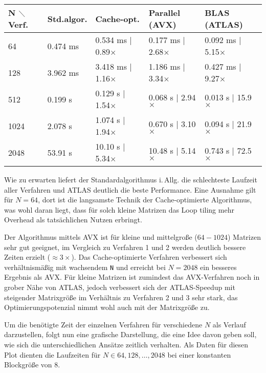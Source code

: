 \documentclass[a4paper,11pt]{scrartcl}
\newcommand{\iAllg}{\mbox{i.\,Allg.}\xspace}
\begin{document}
\begin{center}
\begin{tabular}{| l | l || l || l || l |}
\hline
N $\diagdown$ Verf. & Std.algor. & Cache-opt. & Parallel (AVX) & BLAS (ATLAS)  \\ \hline

64 & 0.474 ms & 0.534 ms | 0.89$\times$ & 0.177 ms | 2.68$\times$ & 0.092 ms | 5.15$\times$  \\ \hline
128 & 3.962 ms & 3.418 ms | 1.16$\times$ & 1.186 ms | 3.34$\times$ & 0.427 ms | 9.27$\times$  \\ \hline 
\hline
512 & 0.199 s & 0.129 s | 1.54$\times$ & 0.068 s | 2.94$\times$ & 0.013 s | 15.9$\times$  \\ \hline
1024 & 2.078 s &  1.074 s | 1.94$\times$ & 0.670 s | 3.10$\times$ & 0.094 s | 21.9$\times$ \\ \hline
2048 & 53.91 s & 10.10 s | 5.34$\times$ & 10.48 s | 5.14$\times$ & 0.743 s | 72.5$\times$ \\ \hline
\end{tabular}
\end{center}

Wie zu erwarten liefert der Standardalgorithmus \iAllg die schlechteste Laufzeit aller 
Verfahren und ATLAS deutlich die beste Performance.
Eine Ausnahme gilt für $N=64$, dort ist die langsamste Technik der Cache-optimierte
Algorithmus, was wohl daran liegt, dass für solch kleine Matrizen das Loop tiling mehr
Overhead als tatsächlichen Nutzen erbringt.\newline

Der Algorithmus mittels AVX ist für kleine und mittelgroße ($64-1024$) Matrizen sehr gut
geeignet, im Vergleich zu Verfahren 1 und 2 werden deutlich bessere Zeiten erzielt
($\approx 3\times$).
Das Cache-optimierte Verfahren verbessert sich verhältnismäßig mit wachsendem \texttt{N}
und erreicht bei $N=2048$ ein besseres Ergebnis als AVX. Für kleine Matrizen ist zumindest das AVX-Verfahren noch in grober Nähe von ATLAS,
jedoch verbessert sich der ATLAS-Speedup mit steigender Matrixgröße im Verhältnis
zu Verfahren 2 und 3 sehr stark, das Optimierungspotenzial nimmt wohl auch mit der Matrixgröße zu.
\newline

Um die benötigte Zeit der einzelnen Verfahren für verschiedene $N$ als Verlauf darzustellen,
folgt nun eine grafische Darstellung, die eine Idee davon geben soll, wie sich die unterschiedlichen
Ansätze zeitlich verhalten. Als Daten für diesen Plot dienten die Laufzeiten für $N \in 64, 128, \ldots ,
2048$ bei einer konstanten Blockgröße von $8$.
\end{document}
